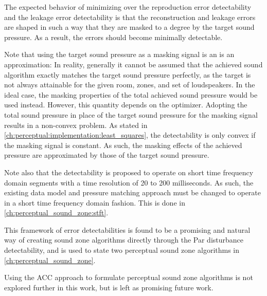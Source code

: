 The expected behavior of minimizing over the reproduction error detectability and the leakage error detectability 
is that the reconstruction and leakage errors are shaped in such a way that they are masked to a degree by the 
target sound pressure.
As a result, the errors should become minimally detectable.

Note that using the target sound pressure as a masking signal is an is an approximation: 
In reality, generally it cannot be assumed that the achieved sound algorithm exactly matches the target sound pressure 
perfectly, as the target is not always attainable for the given room, zones, and set of loudspeakers.
In the ideal case, the masking properties of the total achieved sound pressure would be used instead.
However, this quantity depends on the optimizer.
Adopting the total sound pressure in place of the target sound pressure for the masking signal results in a non-convex 
problem.
As stated in \autoref{ch:perceptual:implementation:least_squares}, the detectability is only convex if the masking signal 
is constant.
As such, the masking effects of the achieved pressure are approximated by those of the target sound pressure.

Note also that the detectability is proposed to operate on short time frequency domain segments 
with a time resolution of 20 to 200 milliseconds. 
As such, the existing data model and pressure matching approach must be changed to operate in a short time frequency 
domain fashion.
This is done in \autoref{ch:perceptual_sound_zone:stft}.

This framework of error detectabilities is found to be a promising and natural 
way of creating sound zone algorithms directly through the Par disturbance detectability,
and is used to state two perceptual sound zone algorithms in \autoref{ch:perceptual_sound_zone}.

Using the ACC approach to formulate perceptual sound zone algorithms is not explored further in this work, 
but is left as promising future work.
